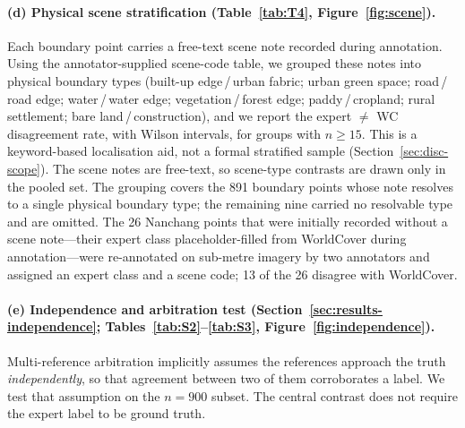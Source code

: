 \paragraph{(d) Physical scene stratification (Table~\ref{tab:T4}, Figure~\ref{fig:scene}).}
Each boundary point carries a free-text scene note recorded during annotation.
Using the annotator-supplied scene-code table, we grouped these notes into
physical boundary types (built-up edge\,/\,urban fabric; urban green space;
road\,/\,road edge; water\,/\,water edge; vegetation\,/\,forest edge;
paddy\,/\,cropland; rural settlement; bare land\,/\,construction), and we report
the expert $\neq$ WC disagreement rate, with Wilson intervals, for groups with
$n \ge 15$. This is a keyword-based localisation aid, not a formal stratified
sample (Section~\ref{sec:disc-scope}). The scene notes are free-text, so
scene-type contrasts are drawn only in the pooled set. The grouping covers the
891 boundary points whose note resolves to a single physical boundary type; the
remaining nine carried no resolvable type and are omitted. The 26 Nanchang
points that were initially recorded without a scene note---their expert class
placeholder-filled from WorldCover during annotation---were re-annotated on
sub-metre imagery by two annotators and assigned an expert class and a scene
code; 13 of the 26 disagree with WorldCover.

\paragraph{(e) Independence and arbitration test (Section~\ref{sec:results-independence};
Tables~\ref{tab:S2}--\ref{tab:S3}, Figure~\ref{fig:independence}).}
Multi-reference arbitration implicitly assumes the references approach the truth
\emph{independently}, so that agreement between two of them corroborates a
label. We test that assumption on the $n = 900$ subset. The central contrast
does not require the expert label to be ground truth.

